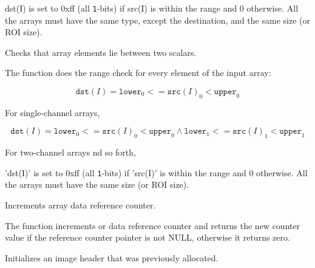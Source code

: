 dst(I) is set to 0xff (all \texttt{1}-bits) if src(I) is within the range and 0 otherwise. All the arrays must have the same type, except the destination, and the same size (or ROI size).


Checks that array elements lie between two scalars.


\begin{description}
\end{description}


The function does the range check for every element of the input array:

\[
\texttt{dst}(I)=\texttt{lower}_0 <= \texttt{src}(I)_0 < \texttt{upper}_0
\]

For single-channel arrays,

\[
\texttt{dst}(I)=
\texttt{lower}_0 <= \texttt{src}(I)_0 < \texttt{upper}_0 \land
\texttt{lower}_1 <= \texttt{src}(I)_1 < \texttt{upper}_1
\]

For two-channel arrays nd so forth,

'dst(I)' is set to 0xff (all \texttt{1}-bits) if 'src(I)' is within the range and 0 otherwise. All the arrays must have the same size (or ROI size).

\ifC
{}
Increments array data reference counter.


\begin{description}
\end{description}

The function increments  or
 data reference counter and returns the new counter value
if the reference counter pointer is not NULL, otherwise it returns zero.

Initializes an image header that was previously allocated.


